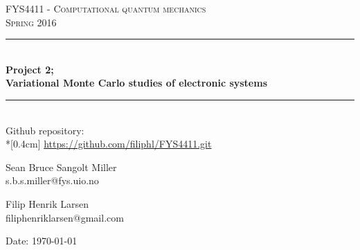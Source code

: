 \documentclass[english, a4paper]{article}
\begin{document}
	\renewcommand{\figurename}{Figure}
	\begin{titlepage}
		\begin{center}
			
			\textsc{\Large FYS4411 - Computational quantum mechanics }\\[0.5cm]
			\textsc{\Large Spring 2016}\\[1.5cm]
			\rule{\linewidth}{0.5mm} \\[0.4cm]
			{ \huge \bfseries  Project 2;\\ Variational Monte Carlo studies of electronic systems}\\[0.10cm]
			\rule{\linewidth}{0.5mm} \\[1.5cm]
			
			{\Large Github repository:} \\*[0.4cm]
			\url{https://github.com/filiphl/FYS4411.git}
			
			\vspace{13.5cm}
			
			\begin{minipage}{\textwidth}
				\begin{minipage}{0.49\textwidth}
					\begin{center} \large
						Sean Bruce Sangolt Miller\\
						{\footnotesize s.b.s.miller@fys.uio.no}
					\end{center}
				\end{minipage}
				\quad
				\begin{minipage}{0.49\textwidth}
					\begin{center} \large
						Filip Henrik Larsen\\
						{\footnotesize filiphenriklarsen@gmail.com}
					\end{center}
				\end{minipage}
			\end{minipage}
			\vfill
			
			\large{Date: \today}
			
		\end{center}
	\end{titlepage}
	
	\begin{abstract}
		
	\end{abstract}
	
	
	\tableofcontents
	\newpage
	
\end{document}
